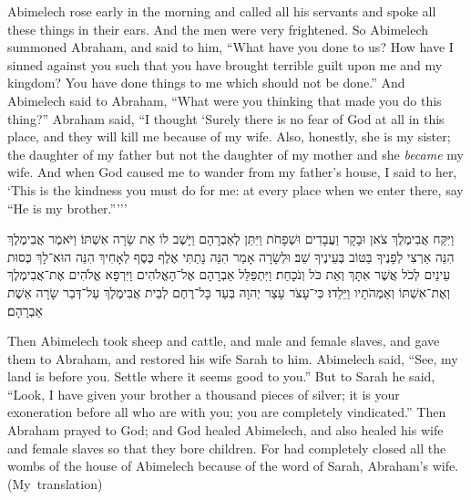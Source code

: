 \begin{translation}
    Abimelech rose early in the morning and called all his servants and spoke all these things in their ears. And the men were very frightened. 
    So Abimelech summoned Abraham, and said to him, ``What have you done to us? How have I sinned against you such that you have brought terrible guilt upon me and my kingdom? You have done things to me which should not be done.''
    And Abimelech said to Abraham, “What were you thinking that made you do this thing?” 
    Abraham said, ``I thought `Surely there is no fear of God at all in this place, and they will kill me because of my wife. 
    Also, honestly, she is my sister; the daughter of my father but not the daughter of my mother and she \emph{became} my wife.
    And when God caused me to wander from my father's house, I said to her, `This is the kindness you must do for me: at every place when we enter there, say  ``He is my brother.'''''
\end{translation}

\begin{hebrewtext}
    וַיִּקַּח אֲבִימֶלֶךְ צֹאן וּבָקָר וַעֲבָדִים וּשְׁפָחֹת וַיִּתֵּן לְאַבְרָהָם וַיָּשֶׁב לוֹ אֵת שָׂרָה אִשְׁתּוֹ׃
    וַיֹּאמֶר אֲבִימֶלֶךְ הִנֵּה אַרְצִי לְפָנֶיךָ בַּטּוֹב בְּעֵינֶיךָ שֵׁב׃
    וּלְשָׂרָה אָמַר הִנֵּה נָתַתִּי אֶלֶף כֶּסֶף לְאָחִיךְ הִנֵּה הוּא־לָךְ כְּסוּת עֵינַיִם לְכֹל אֲשֶׁר אִתָּךְ וְאֵת כֹּל וְנֹכָחַת׃
    וַיִּתְפַּלֵּל אַבְרָהָם אֶל־הָאֱלֹהִים וַיִּרְפָּא אֱלֹהִים אֶת־אֲבִימֶלֶךְ וְאֶת־אִשְׁתּוֹ וְאַמְהֹתָיו וַיֵּלֵדוּ׃
    כִּי־עָצֹר עָצַר יְהוָה בְּעַד כָּל־רֶחֶם לְבֵית אֲבִימֶלֶךְ עַל־דְּבַר שָׂרָה אֵשֶׁת אַבְרָהָם׃  
\end{hebrewtext}

\begin{translation}
    Then Abimelech took sheep and cattle, and male and female slaves, and gave them to Abraham, and restored his wife Sarah to him.
    Abimelech said, ``See, my land is before you. Settle where it seems good to you.'' 
    But to Sarah he said, ``Look, I have given your brother a thousand pieces of silver; it is your exoneration before all who are with you; you are completely vindicated.'' 
    Then Abraham prayed to God; and God healed Abimelech, and also healed his wife and female slaves so that they bore children. 
    For \yahweh had completely closed all the wombs of the house of Abimelech because of the word of Sarah, Abraham's wife. (My~translation)
\end{translation}

